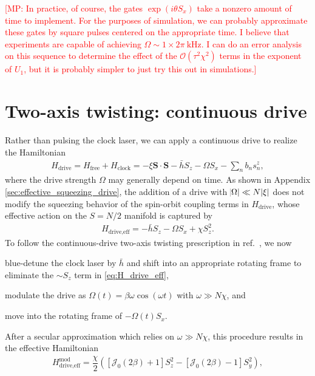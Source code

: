 \documentclass[aps,notitlepage,nofootinbib,11pt]{revtex4-1}
\renewcommand{\t}{\text} %
\newcommand{\f}[2]{\dfrac{#1}{#2}} %
\newcommand{\p}[1]{\left(#1\right)} %
\renewcommand{\sp}[1]{\left[#1\right]} %
\renewcommand{\v}{\bm} %
\renewcommand{\c}{\cdot} %
\newcommand{\J}{\mathcal{J}}
\renewcommand{\O}{\mathcal{O}}
\newcommand{\1}{\hat{\mathds{1}}}
\newcommand{\note}[1]{\textcolor{red}{#1}}
\begin{document}
\note{[MP: In practice, of course, the gates $\exp\p{i\theta S_x}$
  take a nonzero amount of time to implement.  For the purposes of
  simulation, we can probably approximate these gates by square pulses
  centered on the appropriate time.  I believe that experiments are
  capable of achieving $\Omega\sim1\times2\pi~\t{kHz}$.  I can do an
  error analysis on this sequence to determine the effect of the
  $\O\p{\tau^2\chi^2}$ terms in the exponent of $U_1$, but it is
  probably simpler to just try this out in simulations.]}


\section{Two-axis twisting: continuous drive}

Rather than pulsing the clock laser, we can apply a continuous drive
to realize the Hamiltonian
\begin{align}
  H_{\t{drive}} = H_{\t{free}} + H_{\t{clock}}
  = -\xi\v S\c\v S - \bar h S_z - \Omega S_x - \sum_n b_n s_n^z,
\end{align}
where the drive strength $\Omega$ may generally depend on time.  As
shown in Appendix \ref{sec:effective_squeezing_drive}, the addition of
a drive with $\abs{\Omega}\ll N\abs{\xi}$ does not modify the
squeezing behavior of the spin-orbit coupling terms in
$H_{\t{drive}}$, whose effective action on the $S=N/2$ manifold is
captured by
\begin{align}
  H_{\t{drive,eff}} = -\bar h S_z - \Omega S_x + \chi S_z^2.
  \label{eq:H_drive_eff}
\end{align}
To follow the continuous-drive two-axis twisting prescription in
ref.~\cite{huang2015twoaxis}, we now
\begin{enumerate*}[label=(\roman*)]
\item blue-detune the clock laser by $\bar h$ and shift into an
  appropriate rotating frame to eliminate the $\sim S_z$ term in
  \eqref{eq:H_drive_eff},
\item modulate the drive as $\Omega\p{t}=\beta\omega\cos\p{\omega t}$
  with $\omega\gg N\chi$, and
\item move into the rotating frame of $-\Omega\p{t}S_x$.
\end{enumerate*}
After a secular approximation which relies on $\omega\gg N\chi$, this
procedure results in the effective Hamiltonian
\begin{align}
  H_{\t{drive,eff}}^{\t{mod}}
  = \f{\chi}{2} \p{\sp{\J_0\p{2\beta}+1} S_z^2
    - \sp{\J_0\p{2\beta}-1} S_y^2},
\end{align}
\end{document}
